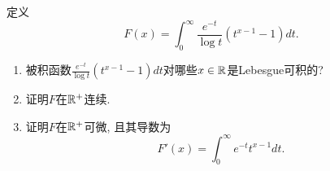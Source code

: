
\begin{exercise}
定义
$$F(x)=\int_0^{\infty} \frac{e^{-t}}{\log t}\left(t^{x-1}-1\right)dt.$$
\begin{enumerate}
    \item 被积函数$\frac{e^{-t}}{\log t}\left(t^{x-1}-1\right)dt$对哪些$x \in \mathbb{R}$是Lebesgue可积的?
    \item 证明$F$在$\mathbb{R}^+$连续.
    \item 证明$F$在$\mathbb{R}^+$可微, 且其导数为
    $$F'(x)=\int_0^{\infty} e^{-t} t^{x-1} dt.$$
\end{enumerate}
\end{exercise}

